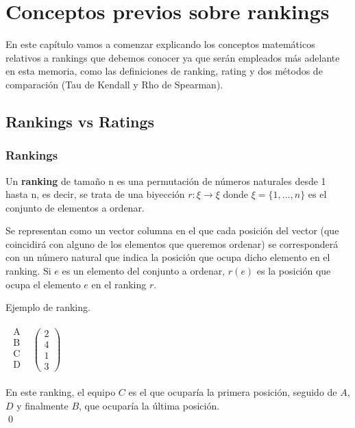 \chapter{Conceptos previos sobre rankings}
En este capítulo vamos a comenzar explicando los conceptos matemáticos relativos a rankings que debemos conocer ya que serán empleados más adelante en esta memoria, como las definiciones de ranking, rating y dos métodos de comparación (Tau de Kendall y Rho de Spearman).

\section{Rankings vs Ratings}

\subsection*{Rankings}
\begin{defi} 
	Un \textbf{ranking} de tamaño n es una permutación de números naturales desde 1 hasta n, es decir, se trata de una biyección $r: \xi \rightarrow \xi$ donde $\xi = \{1,...,n\}$ es el conjunto de elementos a ordenar.
\end{defi}

Se representan como un vector columna en el que cada posición del vector (que coincidirá con alguno de los elementos que queremos ordenar) se corresponderá con un número natural que indica la posición que ocupa dicho elemento en el ranking.  Si $e$ es un elemento del conjunto a ordenar, $r(e)$ es la posición que ocupa el elemento $e$ en el ranking $r$.
 
\begin{ejem} \label{ejem1}
Ejemplo de ranking.
\end{ejem}
\begin{center}
$\begin{array}{ccc}
\begin{array}{c}
\text{A}\\
\text{B} \\
\text{C} \\
\text{D} \\
\end{array} & \left(\begin{array}{c}
2\\
4\\
1\\
3
\end{array} \right)
\end{array}  $
\end{center}
En este ranking, el equipo $C$ es el que ocuparía la primera posición, seguido de $A$, $D$ y finalmente $B$, que ocuparía la última posición.\\
\qed

